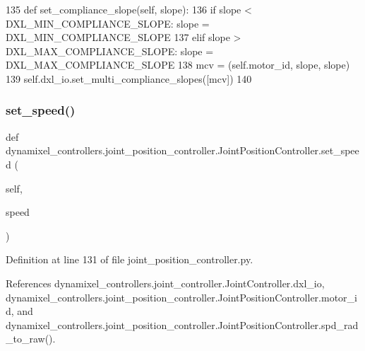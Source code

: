 \begin{DoxyCode}
135     \textcolor{keyword}{def }set\_compliance\_slope(self, slope):
136         \textcolor{keywordflow}{if} slope < DXL\_MIN\_COMPLIANCE\_SLOPE: slope = DXL\_MIN\_COMPLIANCE\_SLOPE
137         \textcolor{keywordflow}{elif} slope > DXL\_MAX\_COMPLIANCE\_SLOPE: slope = DXL\_MAX\_COMPLIANCE\_SLOPE
138         mcv = (self.motor\_id, slope, slope)
139         self.dxl\_io.set\_multi\_compliance\_slopes([mcv])
140 
\end{DoxyCode}
\mbox{\label{classdynamixel__controllers_1_1joint__position__controller_1_1_joint_position_controller_ad5d41a8353d4ddf33d8aa25dc3000efc}} 
\subsubsection{\texorpdfstring{set\+\_\+speed()}{set\_speed()}}
{\footnotesize\ttfamily def dynamixel\+\_\+controllers.\+joint\+\_\+position\+\_\+controller.\+Joint\+Position\+Controller.\+set\+\_\+speed (\begin{DoxyParamCaption}\item[{}]{self,  }\item[{}]{speed }\end{DoxyParamCaption})}



Definition at line 131 of file joint\+\_\+position\+\_\+controller.\+py.



References dynamixel\+\_\+controllers.\+joint\+\_\+controller.\+Joint\+Controller.\+dxl\+\_\+io, dynamixel\+\_\+controllers.\+joint\+\_\+position\+\_\+controller.\+Joint\+Position\+Controller.\+motor\+\_\+id, and dynamixel\+\_\+controllers.\+joint\+\_\+position\+\_\+controller.\+Joint\+Position\+Controller.\+spd\+\_\+rad\+\_\+to\+\_\+raw().


